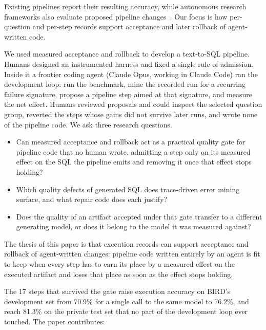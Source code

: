 Existing pipelines report their resulting accuracy, while autonomous
research frameworks also evaluate proposed pipeline changes~\cite{ai-scientist-enterprise}.
Our focus is how per-question and per-step records support acceptance and
later rollback of agent-written code.

We used measured acceptance and rollback to develop a text-to-SQL pipeline. Humans designed an
instrumented harness and fixed a single rule of admission. Inside it a frontier coding agent
(Claude Opus, working in Claude Code) ran the development loop: run the
benchmark, mine the recorded run for a recurring failure signature, propose a
pipeline step aimed at that signature, and measure the net effect. Humans
reviewed proposals and could inspect the selected question group, reverted the steps whose gains
did not survive later runs, and wrote none of the pipeline code. We ask three
research questions.

\begin{itemize}
\item[RQ1] Can measured acceptance and rollback act as a practical quality
  gate for pipeline code that no human wrote, admitting a step only on its
  measured effect on the SQL the pipeline emits and removing it once that
  effect stops holding?
\item[RQ2] Which quality defects of generated SQL does trace-driven error
  mining surface, and what repair code does each justify?
\item[RQ3] Does the quality of an artifact accepted under that gate transfer to
  a different generating model, or does it belong to the model it was measured
  against?
\end{itemize}

The thesis of this paper is that execution records can support acceptance
and rollback of agent-written changes:
pipeline code written entirely by an agent is fit to keep when every step has
to earn its place by a measured effect on the executed artifact and loses that
place as soon as the effect stops holding.

The 17 steps that survived the gate raise execution accuracy on BIRD's
development set from 70.9\% for a single call to the same model to 76.2\%, and
reach 81.3\% on the private test set that no part of the development loop ever
touched. The paper contributes:

